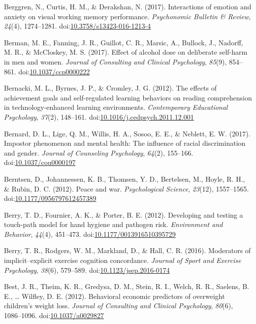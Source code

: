 \documentclass[english,man]{apa6}
\theoremstyle{definition}
\theoremstyle{definition}
\theoremstyle{definition}
\theoremstyle{remark}
\begin{document}
\hypertarget{ref-Berggren2016}{}
Berggren, N., Curtis, H. M., \& Derakshan, N. (2017). Interactions of
emotion and anxiety on visual working memory performance.
\emph{Psychonomic Bulletin \& Review}, \emph{24}(4), 1274--1281.
doi:\href{https://doi.org/10.3758/s13423-016-1213-4}{10.3758/s13423-016-1213-4}

\hypertarget{ref-Berman2017}{}
Berman, M. E., Fanning, J. R., Guillot, C. R., Marsic, A., Bullock, J.,
Nadorff, M. R., \& McCloskey, M. S. (2017). Effect of alcohol dose on
deliberate self-harm in men and women. \emph{Journal of Consulting and
Clinical Psychology}, \emph{85}(9), 854--861.
doi:\href{https://doi.org/10.1037/ccp0000222}{10.1037/ccp0000222}

\hypertarget{ref-Bernacki2012}{}
Bernacki, M. L., Byrnes, J. P., \& Cromley, J. G. (2012). The effects of
achievement goals and self-regulated learning behaviors on reading
comprehension in technology-enhanced learning environments.
\emph{Contemporary Educational Psychology}, \emph{37}(2), 148--161.
doi:\href{https://doi.org/10.1016/j.cedpsych.2011.12.001}{10.1016/j.cedpsych.2011.12.001}

\hypertarget{ref-Bernard2017}{}
Bernard, D. L., Lige, Q. M., Willis, H. A., Sosoo, E. E., \& Neblett, E.
W. (2017). Impostor phenomenon and mental health: The influence of
racial discrimination and gender. \emph{Journal of Counseling
Psychology}, \emph{64}(2), 155--166.
doi:\href{https://doi.org/10.1037/cou0000197}{10.1037/cou0000197}

\hypertarget{ref-Berntsen2012}{}
Berntsen, D., Johannessen, K. B., Thomsen, Y. D., Bertelsen, M., Hoyle,
R. H., \& Rubin, D. C. (2012). Peace and war. \emph{Psychological
Science}, \emph{23}(12), 1557--1565.
doi:\href{https://doi.org/10.1177/0956797612457389}{10.1177/0956797612457389}

\hypertarget{ref-Berry2012}{}
Berry, T. D., Fournier, A. K., \& Porter, B. E. (2012). Developing and
testing a touch-path model for hand hygiene and pathogen risk.
\emph{Environment and Behavior}, \emph{44}(4), 451--473.
doi:\href{https://doi.org/10.1177/0013916510395729}{10.1177/0013916510395729}

\hypertarget{ref-Berry2016}{}
Berry, T. R., Rodgers, W. M., Markland, D., \& Hall, C. R. (2016).
Moderators of implicit--explicit exercise cognition concordance.
\emph{Journal of Sport and Exercise Psychology}, \emph{38}(6), 579--589.
doi:\href{https://doi.org/10.1123/jsep.2016-0174}{10.1123/jsep.2016-0174}

\hypertarget{ref-Best2012}{}
Best, J. R., Theim, K. R., Gredysa, D. M., Stein, R. I., Welch, R. R.,
Saelens, B. E., \ldots{} Wilfley, D. E. (2012). Behavioral economic
predictors of overweight children's weight loss. \emph{Journal of
Consulting and Clinical Psychology}, \emph{80}(6), 1086--1096.
doi:\href{https://doi.org/10.1037/a0029827}{10.1037/a0029827}
\end{document}
